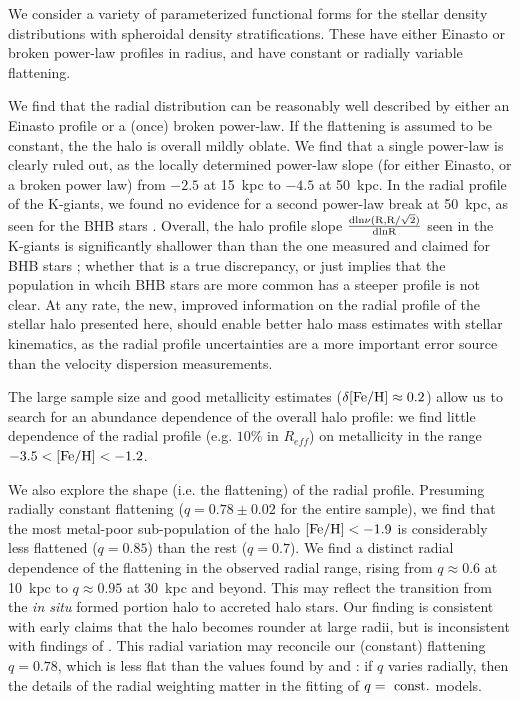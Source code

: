 \documentclass[12pt,preprint]{aastex}
\newcommand{\feh}{{\rm [Fe/H]}}
\begin{document}
We consider a variety of parameterized functional forms for the stellar density distributions
with spheroidal density stratifications. These have either  Einasto or broken power-law profiles 
in radius, and have constant or radially variable flattening. 

We find that the radial distribution can be reasonably well described by either an Einasto profile or a (once) broken power-law. If the flattening is assumed to be constant, the the halo is overall mildly oblate. We find that a single power-law is clearly ruled out, as the locally determined power-law slope (for either Einasto, or a broken power law) from $-2.5$ at 15~kpc to $-4.5$ at 50~kpc. In the radial profile of the K-giants, we found no evidence for a second power-law break at 50~kpc, as seen for the BHB stars \citep{Deason2014}. Overall, the halo profile slope
$\rm \frac{dln\nu(R,R/\sqrt{2})}{dlnR}$ seen in the K-giants is significantly shallower than than the one measured and claimed for BHB stars \citep{Deason2014}; whether that is a true discrepancy, or just implies that the population in whcih BHB stars are more common has 
a steeper profile is not clear.  At any rate, the new, improved information on the radial profile of the stellar halo presented here, should enable better halo mass estimates with stellar kinematics, as the radial profile uncertainties are a more important error source than the velocity dispersion measurements. 

The large sample size and good metallicity estimates ($\delta\feh \approx 0.2$) allow us to 
search for an abundance dependence of the overall halo profile: we find little dependence of the radial profile (e.g. $10\%$ in $R_{eff}$) on metallicity in the range
$\rm -3.5<\feh<-1.2$. 

We also explore the shape (i.e. the flattening) of the radial profile. Presuming radially constant flattening ($q=0.78\pm 0.02$ for the entire sample), we find that the most metal-poor sub-population of the halo $\feh<-1.9$ is considerably less flattened ($q=0.85$) than the rest ($q=0.7$).
We find a distinct radial dependence of the flattening in the observed radial 
range, rising from $q\approx 0.6$ at 10~kpc to $q\approx 0.95$ at 30~kpc and beyond. 
This may reflect the transition from  the \textit{in situ} formed portion halo to accreted halo stars.
Our finding is consistent with early claims \citet{Preston1991} that the halo becomes rounder 
at large radii, but is inconsistent with findings of \citet{Sluis1998, Sesar2011,Deason2011}.
This radial variation may reconcile our (constant) flattening $q=0.78$,
which is less flat than the values found by \citet[;q=0.7]{Sesar2011} 
and \citet[;q=0.58]{Deason2011} : if $q$ varies radially, then the details of the radial weighting matter in the fitting of $q=~\rm const.$ models.
\end{document}
